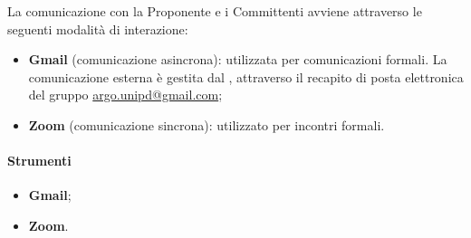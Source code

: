 \par La comunicazione con la Proponente e i Committenti avviene attraverso le seguenti modalità di interazione:
\begin{itemize}
  \item \textbf{Gmail} (comunicazione asincrona): utilizzata per comunicazioni formali. La comunicazione esterna è gestita dal \Responsabile, attraverso il recapito di posta elettronica del gruppo \href{mailto:argo.unipd@gmail.com}{argo.unipd\-@\-gmail.com};
  \item \textbf{Zoom} (comunicazione sincrona): utilizzato per incontri formali.
\end{itemize}

\paragraph*{Strumenti}
\begin{itemize}
  \item \textbf{Gmail};
  \item \textbf{Zoom}.
\end{itemize}
